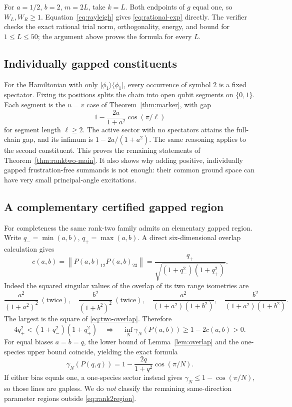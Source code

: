 \documentclass[11pt,a4paper]{article}
\theoremstyle{remark}\newtheorem{remark}[theorem]{Remark}
\newcommand{\ket}[1]{\lvert #1\rangle}
\newcommand{\bra}[1]{\langle #1\rvert}
\newcommand{\norm}[1]{\left\lVert #1\right\rVert}
\begin{document}
For $a=1/2$, $b=2$, $m=2L$, take $k=L$. Both endpoints of $g$ equal one, so $W_L,W_R\ge1$. Equation~\eqref{eq:rayleigh} gives \eqref{eq:rational-exp} directly. The verifier checks the exact rational trial norm, orthogonality, energy, and bound for $1\le L\le50$; the argument above proves the formula for every $L$.

\subsection{Individually gapped constituents}
For the Hamiltonian with only $\ket{\phi_1}\bra{\phi_1}$, every occurrence of symbol $2$ is a fixed spectator. Fixing its positions splits the chain into open qubit segments on $\{0,1\}$. Each segment is the $u=v$ case of Theorem~\ref{thm:marker}, with gap
\[
 1-\frac{2a}{1+a^2}\cos(\pi/\ell)
\]
for segment length $\ell\ge2$. The active sector with no spectators attains the full-chain gap, and its infimum is $1-2a/(1+a^2)$. The same reasoning applies to the second constituent. This proves the remaining statements of Theorem~\ref{thm:ranktwo-main}. It also shows why adding positive, individually gapped frustration-free summands is not enough: their common ground space can have very small principal-angle excitations.

\subsection{A complementary certified gapped region}
For completeness the same rank-two family admits an elementary gapped region. Write
$q_- =\min(a,b)$, $q_+=\max(a,b)$. A direct six-dimensional overlap calculation gives
\begin{equation}\label{eq:two-overlap}
 c(a,b)=\norm{P(a,b)_{12}P(a,b)_{23}}
       =\frac{q_+}{\sqrt{(1+q_-^2)(1+q_+^2)}}.
\end{equation}
Indeed the squared singular values of the overlap of its two range isometries are
\[
 \frac{a^2}{(1+a^2)^2}\ (\text{twice}),\quad
 \frac{b^2}{(1+b^2)^2}\ (\text{twice}),\quad
 \frac{a^2}{(1+a^2)(1+b^2)},\quad
 \frac{b^2}{(1+a^2)(1+b^2)}.
\]
The largest is the square of \eqref{eq:two-overlap}. Therefore
\begin{equation}\label{eq:rank2region}
 4q_+^2<(1+q_-^2)(1+q_+^2)
 \quad\Longrightarrow\quad
 \inf_N\gamma_N(P(a,b))\ge1-2c(a,b)>0.
\end{equation}
For equal biases $a=b=q$, the lower bound of Lemma~\ref{lem:overlap} and the one-species upper bound coincide, yielding the exact formula
\[
 \gamma_N(P(q,q))=1-\frac{2q}{1+q^2}\cos(\pi/N).
\]
If either bias equals one, a one-species sector instead gives
$\gamma_N\le1-\cos(\pi/N)$, so those lines are gapless. We do \emph{not} classify the remaining same-direction parameter regions outside \eqref{eq:rank2region}.
\end{document}
